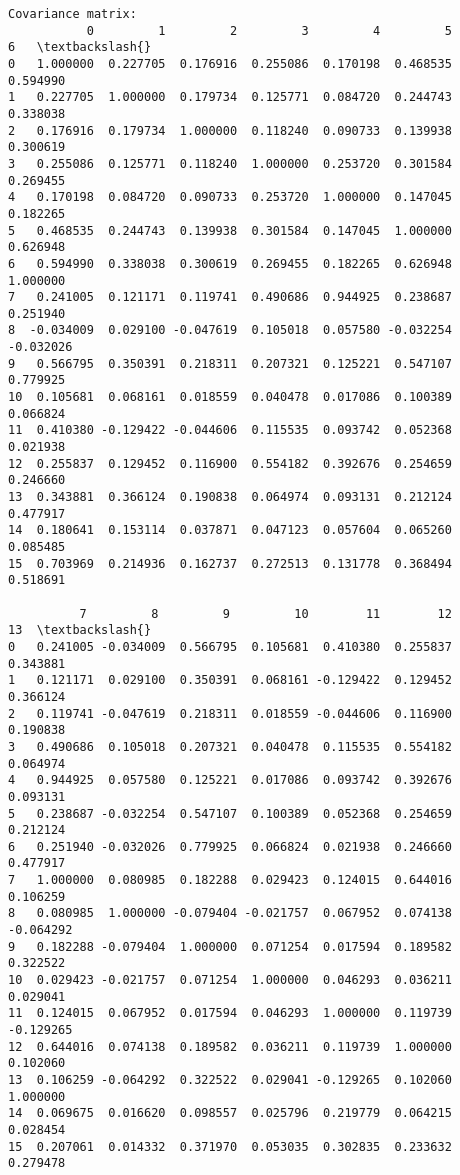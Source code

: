 \documentclass[11pt]{article}
\begin{document}
    \begin{Verbatim}[commandchars=\\\{\}]
Covariance matrix: 
           0         1         2         3         4         5         6   \textbackslash{}
0   1.000000  0.227705  0.176916  0.255086  0.170198  0.468535  0.594990   
1   0.227705  1.000000  0.179734  0.125771  0.084720  0.244743  0.338038   
2   0.176916  0.179734  1.000000  0.118240  0.090733  0.139938  0.300619   
3   0.255086  0.125771  0.118240  1.000000  0.253720  0.301584  0.269455   
4   0.170198  0.084720  0.090733  0.253720  1.000000  0.147045  0.182265   
5   0.468535  0.244743  0.139938  0.301584  0.147045  1.000000  0.626948   
6   0.594990  0.338038  0.300619  0.269455  0.182265  0.626948  1.000000   
7   0.241005  0.121171  0.119741  0.490686  0.944925  0.238687  0.251940   
8  -0.034009  0.029100 -0.047619  0.105018  0.057580 -0.032254 -0.032026   
9   0.566795  0.350391  0.218311  0.207321  0.125221  0.547107  0.779925   
10  0.105681  0.068161  0.018559  0.040478  0.017086  0.100389  0.066824   
11  0.410380 -0.129422 -0.044606  0.115535  0.093742  0.052368  0.021938   
12  0.255837  0.129452  0.116900  0.554182  0.392676  0.254659  0.246660   
13  0.343881  0.366124  0.190838  0.064974  0.093131  0.212124  0.477917   
14  0.180641  0.153114  0.037871  0.047123  0.057604  0.065260  0.085485   
15  0.703969  0.214936  0.162737  0.272513  0.131778  0.368494  0.518691   

          7         8         9         10        11        12        13  \textbackslash{}
0   0.241005 -0.034009  0.566795  0.105681  0.410380  0.255837  0.343881   
1   0.121171  0.029100  0.350391  0.068161 -0.129422  0.129452  0.366124   
2   0.119741 -0.047619  0.218311  0.018559 -0.044606  0.116900  0.190838   
3   0.490686  0.105018  0.207321  0.040478  0.115535  0.554182  0.064974   
4   0.944925  0.057580  0.125221  0.017086  0.093742  0.392676  0.093131   
5   0.238687 -0.032254  0.547107  0.100389  0.052368  0.254659  0.212124   
6   0.251940 -0.032026  0.779925  0.066824  0.021938  0.246660  0.477917   
7   1.000000  0.080985  0.182288  0.029423  0.124015  0.644016  0.106259   
8   0.080985  1.000000 -0.079404 -0.021757  0.067952  0.074138 -0.064292   
9   0.182288 -0.079404  1.000000  0.071254  0.017594  0.189582  0.322522   
10  0.029423 -0.021757  0.071254  1.000000  0.046293  0.036211  0.029041   
11  0.124015  0.067952  0.017594  0.046293  1.000000  0.119739 -0.129265   
12  0.644016  0.074138  0.189582  0.036211  0.119739  1.000000  0.102060   
13  0.106259 -0.064292  0.322522  0.029041 -0.129265  0.102060  1.000000   
14  0.069675  0.016620  0.098557  0.025796  0.219779  0.064215  0.028454   
15  0.207061  0.014332  0.371970  0.053035  0.302835  0.233632  0.279478   


\end{Verbatim}
\end{document}
